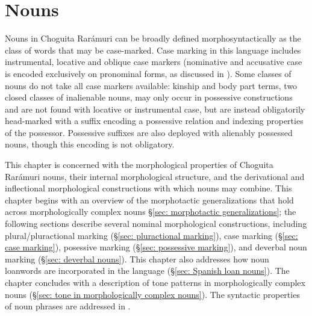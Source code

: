 \chapter{Nouns}
\label{chap: nominal morphology}

Nouns in Choguita Rarámuri can be broadly defined morphosyntactically as the class of words that may be case-marked. Case marking in this language includes instrumental, locative and oblique case markers (nominative and accusative case is encoded exclusively on pronominal forms, as discussed in ). Some classes of nouns do not take all case markers available: kinship and body part terms, two closed classes of inalienable nouns, may only occur in possessive constructions and are not found with locative or instrumental case, but are instead obligatorily head-marked with a suffix encoding a possessive relation and indexing properties of the possessor. Possessive suffixes are also deployed with alienably possessed nouns, though this encoding is not obligatory.

This chapter is concerned with the morphological properties of Choguita Rarámuri nouns, their internal morphological structure, and the derivational and inflectional morphological constructions with which nouns may combine. This chapter begins with an overview of the morphotactic generalizations that hold across morphologically complex nouns §\ref{sec: morphotactic generalizations}; the following sections describe several nominal morphological constructions, including plural/pluractional marking (§\ref{sec: pluractional marking}), case marking (§\ref{sec: case marking}), posessive marking (§\ref{sec: possessive marking}), and deverbal noun marking (§\ref{sec: deverbal nouns}). This chapter also addresses how  noun loanwords are incorporated in the language (§\ref{sec: Spanish loan nouns}). The chapter concludes with a description of tone patterns in morphologically complex nouns (§\ref{sec: tone in morphologically complex nouns}). The syntactic properties of noun phrases are addressed in .



